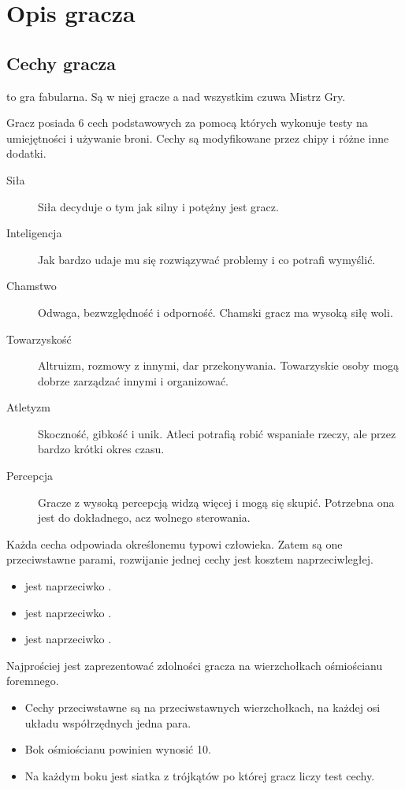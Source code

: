 \chapter{Opis gracza}
\section{Cechy gracza}
\kosmoramus to gra fabularna. Są w niej gracze a nad wszystkim czuwa Mistrz Gry.

Gracz posiada 6 cech podstawowych za pomocą których wykonuje testy na umiejętności i używanie broni.
Cechy są modyfikowane przez chipy i różne inne dodatki.
\begin{description}
 \item[Siła \abs] Siła decyduje o tym jak silny i potężny jest gracz.
 \item[Inteligencja \abi] Jak bardzo udaje mu się rozwiązywać problemy i co potrafi wymyślić.
 \item[Chamstwo \abh] Odwaga, bezwzględność i odporność. Chamski gracz ma wysoką siłę woli.
 \item[Towarzyskość \abt] Altruizm, rozmowy z innymi, dar przekonywania. Towarzyskie osoby mogą dobrze zarządzać innymi i organizować.
 \item[Atletyzm \aba] Skoczność, gibkość i unik. Atleci potrafią robić wspaniałe rzeczy, ale przez bardzo krótki okres czasu.
 \item[Percepcja \abp] Gracze z wysoką percepcją widzą więcej i mogą się skupić. Potrzebna ona jest do dokładnego, acz wolnego sterowania.
\end{description}

Każda cecha odpowiada określonemu typowi człowieka.
Zatem są one przeciwstawne parami, rozwijanie jednej cechy jest kosztem naprzeciwległej.
\begin{itemize}
 \item \abs jest naprzeciwko \abi.
 \item \abh jest naprzeciwko \abt.
 \item \aba jest naprzeciwko \abp.
\end{itemize}

Najprościej jest zaprezentować zdolności gracza na wierzchołkach ośmiościanu foremnego.
\begin{itemize}
 \item Cechy przeciwstawne są na przeciwstawnych wierzchołkach, na każdej osi układu współrzędnych jedna para.
 \item Bok ośmiościanu powinien wynosić 10.
 \item Na każdym boku jest siatka z trójkątów po której gracz liczy test cechy.
\end{itemize}

